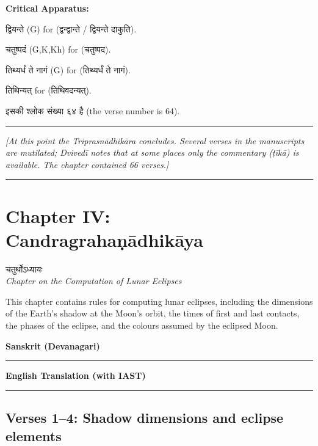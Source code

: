\documentclass[11pt,a4paper]{article}
\newcommand{\dev}[1]{{\devanagarifont #1}}
\newcommand{\columnheaders}{%
  \noindent
  \begin{minipage}[t]{0.47\textwidth}
  \centering
  \textbf{\large Sanskrit (Devanagari)}\\[0.1cm]
  \rule{0.8\textwidth}{0.5pt}
  \end{minipage}%
  \hfill
  \begin{minipage}[t]{0.47\textwidth}
  \centering
  \textbf{\large English Translation (with IAST)}\\[0.1cm]
  \rule{0.8\textwidth}{0.5pt}
  \end{minipage}%
  \vspace{0.3cm}
  \par
}
\newenvironment{variants}{%
  \small%
  \color{varecolor}%
  \list{}{\leftmargin=2em\itemindent=-1em}%
}{\endlist}
\begin{document}
\vspace{0.4cm}
\textcolor{varecolor}{\textbf{Critical Apparatus:}}
\begin{variants}
\item[64.1] \dev{द्वियन्ते} (G) \dev{for} (\dev{द्वन्द्वान्ते} / \dev{द्वियन्ते दाकुति}).
\item[64.2] \dev{चतुष्पदं} (G,K,Kh) \dev{for} (\dev{चतुष्पद}).
\item[64.3] \dev{तिथ्यर्धं ते नागं} (G) \dev{for} (\dev{तिथ्यर्धं ते नागं}).
\item[66.1] \dev{तिथिन्यत्} \dev{for} (\dev{तिथिवदन्यत्}).
\item[\dev{वि०}] \dev{इसकी श्लोक संख्या ६४ है} (the verse number is 64).
\end{variants}

\vspace{0.5cm}
\hrule
\vspace{0.3cm}
\textit{[At this point the Triprasnādhikāra concludes. Several verses in the manuscripts
are mutilated; Dvivedī notes that at some places only the commentary (ṭīkā) is available.
The chapter contained 66 verses.]}
\vspace{0.3cm}
\hrule
\vspace{0.5cm}

\newpage


\section*{Chapter IV: Candragrahaṇādhikāya}

\begin{center}
\dev{चतुर्थोऽध्यायः}\\[0.2cm]
\textit{Chapter on the Computation of Lunar Eclipses}
\end{center}

This chapter contains rules for computing lunar eclipses, including the dimensions
of the Earth's shadow at the Moon's orbit, the times of first and last contacts,
the phases of the eclipse, and the colours assumed by the eclipsed Moon.

\vspace{0.3cm}
\columnheaders

\subsection*{Verses 1--4: Shadow dimensions and eclipse elements}
\end{document}
